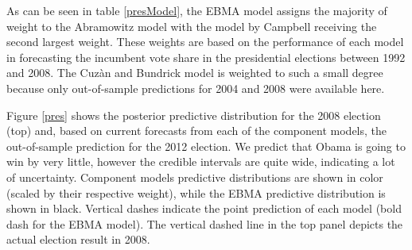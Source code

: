 \documentclass[12pt,fullpage,endnotes]{article}
\begin{document}

As can be seen in table \ref{presModel}, the EBMA model assigns the majority of weight to the Abramowitz model with the model by Campbell receiving the second largest weight. These weights are based on the performance of each model in forecasting the incumbent vote share in the presidential elections between 1992 and 2008. The Cuz\`an and Bundrick model is weighted to such a small degree because only out-of-sample predictions for 2004 and 2008 were available here.

Figure \ref{pres} shows the posterior predictive distribution for the
2008 election (top) and, based on current forecasts from each of the
component models, the out-of-sample prediction for the 2012 election.  We predict that Obama is going to
win by very little, however the credible intervals are quite wide, indicating a lot of uncertainty. Component models predictive distributions are shown in color (scaled by their respective weight), while the EBMA predictive distribution is shown in black. Vertical dashes indicate the point prediction of each model (bold dash for the EBMA model). The vertical dashed line in the top panel depicts the actual election result in 2008.
\end{document}

